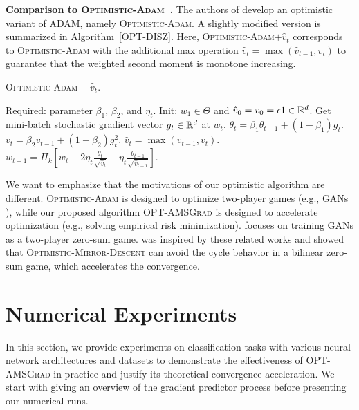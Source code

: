\documentclass[twoside]{article}
\begin{document}
\textbf{Comparison to \textsc{Optimistic-Adam}~\citep{DISZ18}.}\hspace{0.1in} The authors of \cite{DISZ18} develop an optimistic variant of ADAM, namely \textsc{Optimistic-Adam}. 
A slightly modified version is summarized in Algorithm~\ref{OPT-DISZ}. 
Here, \textsc{Optimistic-Adam$+\hat{v}_t$} corresponds to \textsc{Optimistic-Adam} with the additional max operation $\hat{v}_t = \max ( \hat{v}_{t-1}, v_t)$ to guarantee that the weighted second moment is monotone increasing.
\vspace{-0.1in}
\begin{algorithm}[H]
\begin{algorithmic}[1]
\caption{\textsc{Optimistic-Adam~\citep{DISZ18}+$\hat{v}_t$}. \label{OPT-DISZ}}
\STATE Required: parameter $\beta_1$, $\beta_2$, and $\eta_t$.
\STATE Init: $w_1 \in \Theta$ and $\hat{v}_0 = v_{0} = \epsilon 1 \in \mathbb{R}^{d}$.
\STATE Get mini-batch stochastic gradient vector $g_t \in \mathbb{R}^d$ at $w_t$.
\STATE $\theta_t = \beta_{1} \theta_{t-1} + (1 - \beta_{1}) g_t$.
\STATE $v_t = \beta_2 v_{t-1} + (1 - \beta_2) g_t^2$.
\STATE $\hat{v}_t = \max( \hat{v}_{t-1} , v_t )$.
\STATE $w_{t+1} = \Pi_{k}[ w_{t} - 2 \eta_t \frac{\theta_t}{ \sqrt{\hat{v}_t }}
+ \eta_t \frac{\theta_{t-1}}{ \sqrt{\hat{v}_{t-1}} }]$.
\ENDFOR
\end{algorithmic}
\end{algorithm}
\vspace{-0.1in}
We want to emphasize that the motivations of our optimistic algorithm are different. 
\textsc{Optimistic-Adam} is designed to optimize two-player games (e.g., GANs \citep{goodfellow2014generative}), while our proposed algorithm \textsc{OPT-AMSGrad} is designed to accelerate optimization (e.g., solving empirical risk minimization).
\citep{DISZ18} focuses on training GANs \citep{goodfellow2014generative} as a two-player zero-sum game. 
\citep{DISZ18} was inspired by these related works and showed that \textsc{Optimistic-Mirror-Descent} can avoid the cycle behavior in a bilinear zero-sum game, which accelerates the convergence. 


\vspace{-0.1in}
\section{Numerical Experiments}\label{sec:numerical}
\vspace{-0.05in}
In this section, we provide experiments on classification tasks with various neural network architectures and datasets to demonstrate the effectiveness of \textsc{OPT-AMSGrad} in practice and justify its theoretical convergence acceleration.
We start with giving an overview of the gradient predictor process before presenting our numerical runs.
\end{document}
